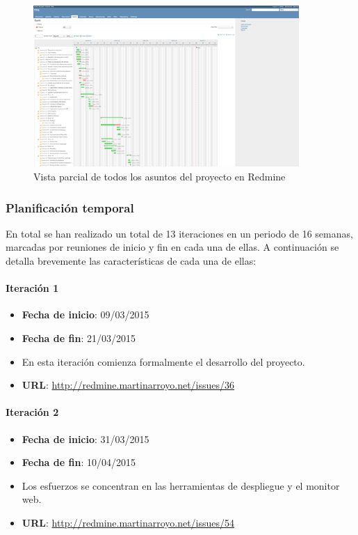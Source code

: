 \begin{figure}[H]
	\centering
	\includegraphics[width=0.9\textwidth]{Figures/redminevista}
	\caption{Vista parcial de todos los asuntos del proyecto en Redmine}
\end{figure}


\subsubsection{Planificación temporal}

En total se han realizado un total de 13 iteraciones en un periodo de 16 semanas, marcadas por reuniones de inicio y fin en cada una de ellas. A continuación se detalla brevemente las características de cada una de ellas:

\paragraph{Iteración 1\\}
\begin{itemize}
\item \textbf{Fecha de inicio}: 09/03/2015
\item \textbf{Fecha de fin}: 21/03/2015
\item En esta iteración comienza formalmente el desarrollo del proyecto.
\item \textbf{URL}: \href{http://redmine.martinarroyo.net/issues/36}{http://redmine.martinarroyo.net/issues/36}
\end{itemize}


\paragraph{Iteración 2\\}
\begin{itemize}
\item \textbf{Fecha de inicio}: 31/03/2015
\item \textbf{Fecha de fin}: 10/04/2015
\item Los esfuerzos se concentran en las herramientas de despliegue y el monitor web.
\item \textbf{URL}: \href{http://redmine.martinarroyo.net/issues/54}{http://redmine.martinarroyo.net/issues/54}
\end{itemize}

